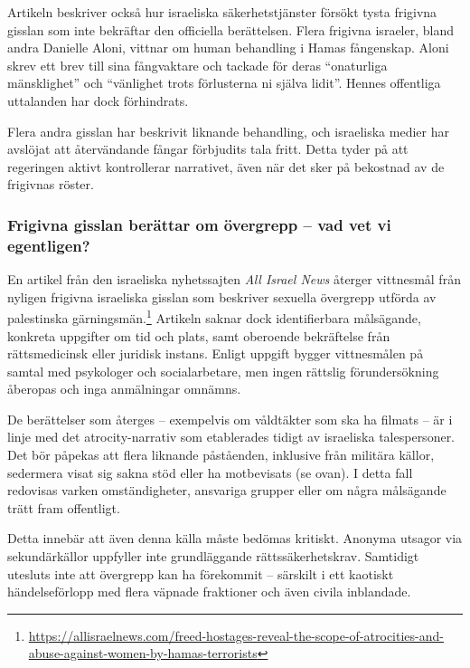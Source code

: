 \documentclass[12pt]{article}
\begin{document}
Artikeln beskriver också hur israeliska säkerhetstjänster försökt tysta frigivna gisslan som inte bekräftar den officiella berättelsen. Flera frigivna israeler, bland andra Danielle Aloni, vittnar om human behandling i Hamas fångenskap. Aloni skrev ett brev till sina fångvaktare och tackade för deras “onaturliga mänsklighet” och “vänlighet trots förlusterna ni själva lidit”. Hennes offentliga uttalanden har dock förhindrats.

Flera andra gisslan har beskrivit liknande behandling, och israeliska medier har avslöjat att återvändande fångar förbjudits tala fritt. Detta tyder på att regeringen aktivt kontrollerar narrativet, även när det sker på bekostnad av de frigivnas röster.

\subsubsection*{Frigivna gisslan berättar om övergrepp – vad vet vi egentligen?}

En artikel från den israeliska nyhetssajten \textit{All Israel News} återger vittnesmål från nyligen frigivna israeliska gisslan som beskriver sexuella övergrepp utförda av palestinska gärningsmän.\footnote{\url{https://allisraelnews.com/freed-hostages-reveal-the-scope-of-atrocities-and-abuse-against-women-by-hamas-terrorists}} Artikeln saknar dock identifierbara målsägande, konkreta uppgifter om tid och plats, samt oberoende bekräftelse från rättsmedicinsk eller juridisk instans. Enligt uppgift bygger vittnesmålen på samtal med psykologer och socialarbetare, men ingen rättslig förundersökning åberopas och inga anmälningar omnämns.

De berättelser som återges – exempelvis om våldtäkter som ska ha filmats – är i linje med det atrocity-narrativ som etablerades tidigt av israeliska talespersoner. Det bör påpekas att flera liknande påståenden, inklusive från militära källor, sedermera visat sig sakna stöd eller ha motbevisats (se ovan). I detta fall redovisas varken omständigheter, ansvariga grupper eller om några målsägande trätt fram offentligt.

Detta innebär att även denna källa måste bedömas kritiskt. Anonyma utsagor via sekundärkällor uppfyller inte grundläggande rättssäkerhetskrav. Samtidigt utesluts inte att övergrepp kan ha förekommit – särskilt i ett kaotiskt händelseförlopp med flera väpnade fraktioner och även civila inblandade. 
\end{document}
